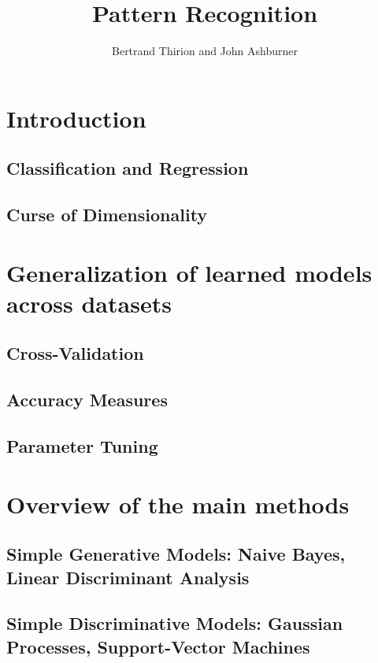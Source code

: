 \documentclass{beamer}
\title{Pattern Recognition}
\author{Bertrand Thirion and John Ashburner}
\date{}
\begin{document}
\begin{frame}
\titlepage
\end{frame}

\section{Introduction}
    \subsection{Classification and Regression}                               
    \subsection{Curse of Dimensionality}                                     
\section{Generalization of learned models across datasets}
    \subsection{Cross-Validation}                                            
    \subsection{Accuracy Measures}                                           
    \subsection{Parameter Tuning}                                            
\section{Overview of the main methods}
    \subsection{Simple Generative Models: Naive Bayes, Linear Discriminant Analysis}       
    \subsection{Simple Discriminative Models: Gaussian Processes, Support-Vector Machines} 
\end{document}
